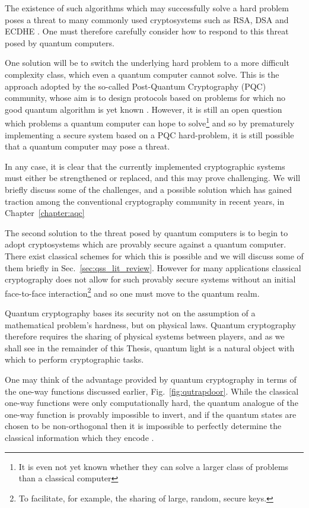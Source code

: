 The existence of such algorithms which may successfully solve a hard problem poses a threat to many commonly used cryptosystems such as RSA, DSA and ECDHE \cite{Rivest1976, Schneier1996, Amiri2015, Nielsen2010}. One must therefore carefully consider how to respond to this threat posed by quantum computers. 

One solution will be to switch the underlying hard problem to a more difficult complexity class, which even a quantum computer cannot solve. This is the approach adopted by the so-called Post-Quantum Cryptography (PQC) community, whose aim is to design protocols based on problems for which no good quantum algorithm is yet known \cite{Bernstein2017, Chen2016, Gagliardoni2017a, Bernstein2019, Alagic2019, Chrome2016}. However, it is still an open question which problems a quantum computer can hope to solve\footnote{It is even not yet known whether they can solve a larger class of problems than a classical computer} and so by prematurely implementing a secure system based on a PQC hard-problem, it is still possible that a quantum computer may pose a threat.

In any case, it is clear that the currently implemented cryptographic systems must either be strengthened or replaced, and this may prove challenging. We will briefly discuss some of the challenges, and a possible solution which has gained traction among the conventional cryptography community in recent years, in Chapter~\ref{chapter:aqc}

The second solution to the threat posed by quantum computers is to begin to adopt cryptosystems which are provably secure against a quantum computer. There exist classical schemes for which this is possible and we will discuss some of them briefly in Sec.~\ref{sec:qss_lit_review}. However for many applications classical cryptography does not allow for such provably secure systems without an initial face-to-face interaction\footnote{To facilitate, for example, the sharing of large, random, secure keys.} and so one must move to the quantum realm.

Quantum cryptography bases its security not on the assumption of a mathematical problem's hardness, but on physical laws. Quantum cryptography therefore requires the sharing of physical systems between players, and as we shall see in the remainder of this Thesis, quantum light is a natural object with which to perform cryptographic tasks. 

One may think of the advantage provided by quantum cryptography in terms of the one-way functions discussed earlier, Fig.~\ref{fig:qutrapdoor}. While the classical one-way functions were only computationally hard, the quantum analogue of the one-way function is provably impossible to invert, and if the quantum states are chosen to be non-orthogonal then it is impossible to perfectly determine the classical information which they encode \cite{Nielsen2010, brendon_book}.

